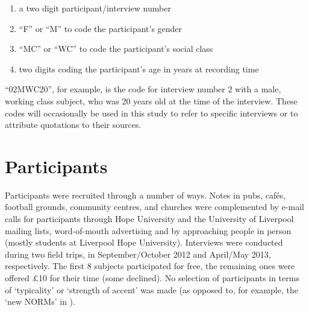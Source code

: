 \begin{enumerate}
	\item a two digit participant/interview number
	\item ``F'' or ``M'' to code the participant's gender
	\item ``MC'' or ``WC'' to code the participant's social class
	\item two digits coding the participant's age in years at recording time
\end{enumerate}

``02MWC20'', for example, is the code for interview number 2 with a male, working class subject, who was 20 years old at the time of the interview.
These codes will occasionally be used in this study to refer to specific interviews or to attribute quotations to their sources.

	\section{Participants}\label{sec.prod_method.participants}
	
Participants were recruited through a number of ways. Notes in pubs, cafés, football grounds, community centres, and churches were complemented by e-mail calls for participants through Hope University and the University of Liverpool mailing lists, word-of-mouth advertising and by approaching people in person (mostly students at Liverpool Hope University). Interviews were conducted during two field trips, in September/October 2012 and April/May 2013, respectively. The first 8 subjects participated for free, the remaining ones were offered £10 for their time (some declined). No selection of participants in terms of `typicality' or `strength of accent' was made (as opposed to, for example, the `new NORMs' in \citealt{honeybone2001}).

